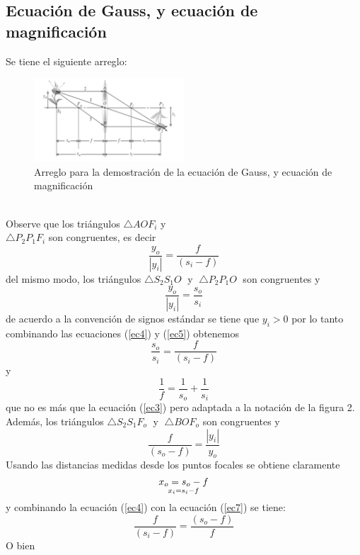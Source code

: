 \documentclass[13,twocolumn,letterpaper]{article}
\begin{document}
{	\subsection*{Ecuación de Gauss, y ecuación de magnificación}
	{
		Se tiene el siguiente arreglo:
		\begin{figure}[!htb]
			\centering
			\includegraphics[width=0.5\textwidth]{./fig2}
			\caption[Fig 1]{\footnotesize{Arreglo para la demostración de la ecuación de Gauss, y ecuación de magnificación}}
			\label{fig:fig-2}
		\end{figure}	
	\\Observe que los triángulos $\triangle AOF_{i}$ y \\$\triangle P_{2}P_{1}F_{i}$ son congruentes, es decir 
	\begin{equation}\label{ec4}
		\dfrac{y_{o}}{|y_{i}|}=\dfrac{f}{(s_{i}-f)}
	\end{equation}
	del mismo modo, los triángulos $\triangle S_{2}S_{1}O\;$ y $\;\triangle P_{2}P_{1}O\;$ son congruentes y 
	\begin{equation}\label{ec5}
		\dfrac{y_{o}}{|y_{i}|}=\dfrac{s_{o}}{s_{i}}
	\end{equation}
	de acuerdo a la convención de signos estándar se tiene que $y_{i}>0$ por lo tanto combinando las ecuaciones (\ref{ec4}) y (\ref{ec5})
	obtenemos
	\begin{equation}\label{ec6}
		\dfrac{s_{o}}{s_{i}}=\dfrac{f}{(s_{i}-f)}
	\end{equation} 
	y 
	$$\dfrac{1}{f}=\dfrac{1}{s_{o}}+\dfrac{1}{s_{i}}$$
	que no es más que la ecuación (\ref{ec3}) pero adaptada a la notación de la figura 2. \\
	Además, los triángulos $\triangle S_{2}S_{1}F_{o}\;$ y $\;\triangle BOF_{o}$ son congruentes y
	\begin{equation}\label{ec7}
		\dfrac{f}{(s_{o}-f)}=\dfrac{|y_{i}|}{y_{o}}
	\end{equation}
	Usando las distancias medidas desde los puntos focales se obtiene claramente 
	\begin{equation}\label{ec8}
		x_{o}=s_{o}-f\atop
		x_{i}=s_{i}-f
	\end{equation}
	 y combinando la ecuación (\ref{ec4}) con la ecuación (\ref{ec7}) se tiene:
	$$\dfrac{f}{(s_{i}-f)}=\dfrac{(s_{o}-f)}{f}$$
	O bien
	
}}
\end{document}
